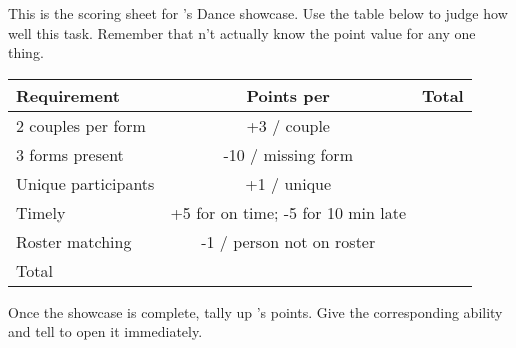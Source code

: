 \documentclass[green]{NeptuneBall}
\begin{document}
\name{\gDanceScoring{}}

This is the scoring sheet for \cPrincess{}'s Dance showcase. Use the table below to judge how well \cPrincess{\they}  this task. Remember that \cPrincess{\they} \cPrincess{\do}n't actually know the point value for any one thing.

\begin{tabular}{| l | c | r |}
  \hline
  Requirement & Points per & Total \\ \hline \hline
  2 couples per form & +3 / couple & \hspace{2cm} \\ \hline
  3 forms present & -10 / missing form & \hspace{2cm} \\ \hline
  Unique participants & +1 / unique & \hspace{2cm} \\ \hline
  Timely & +5 for on time; -5 for 10 min late & \hspace{2cm} \\ \hline
  Roster matching & -1 / person not on roster & \hspace{2cm} \\ \hline \hline
  Total & & \hspace{2cm} \\ \hline
\end{tabular}

Once the showcase is complete, tally up \cPrincess{}'s points. Give \cPrincess{\them} the corresponding ability and tell \cPrincess{\them} to open it immediately.
  
\end{document}
